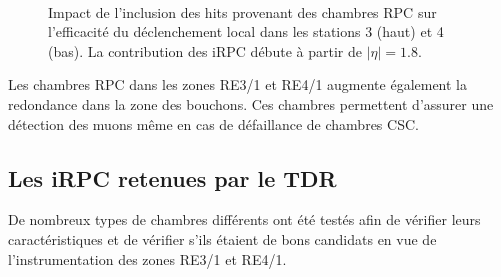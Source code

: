 \begin{itemize}[label=$\bullet$]
	\begin{figure}[ht!]
	 	\centering
	 	\\
	 	\caption{Impact de l'inclusion des hits provenant des chambres RPC sur l'efficacité du déclenchement local dans les stations \num{3} (haut) et \num{4} (bas). La contribution des iRPC débute à partir de $|\eta|=\num{1.8}$.}
	 	\label{effii}
	 \end{figure}
	
	Les chambres RPC dans les zones RE3/1 et RE4/1 augmente également la redondance dans la zone des bouchons. Ces chambres permettent d'assurer une détection des muons même en cas de défaillance de chambres CSC.
\end{itemize}

\subsection{Les iRPC retenues par le TDR}
De nombreux types de chambres différents ont été testés afin de vérifier leurs caractéristiques et de vérifier s'ils étaient de bons candidats en vue de l'instrumentation des zones RE3/1 et RE4/1.

